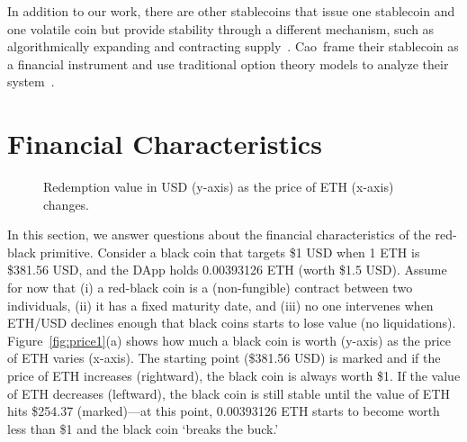 In addition to our work, there are other stablecoins that issue one stablecoin and one volatile coin but provide stability through a different mechanism, such as algorithmically expanding and contracting supply~\cite{Sam15}. Cao~\etal frame their stablecoin as a financial instrument and use traditional option theory models to analyze their system~\cite{DUOnet}.


\section{Financial Characteristics}


\begin{figure}[t]
    \centering
        \qquad
    \caption[Red-Black Coins Price Changes]{Redemption value in USD (y-axis) as the price of ETH (x-axis) changes. \label{fig:price1} \label{fig:price2}}
\end{figure}

In this section, we answer questions about the financial characteristics of the red-black primitive. Consider a black coin that targets \$1 USD when 1 ETH is \$381.56 USD, and the DApp holds 0.00393126 ETH (worth \$1.5 USD).  Assume for now that (i) a red-black coin is a (non-fungible) contract between two individuals, (ii) it has a fixed maturity date, and (iii) no one intervenes when ETH/USD declines enough that black coins starts to lose value (no liquidations). Figure~\ref{fig:price1}(a) shows how much a black coin is worth (y-axis) as the price of ETH varies (x-axis). The starting point (\$381.56 USD) is marked and if the price of ETH increases (rightward), the black coin is always worth \$1. If the value of ETH decreases (leftward), the black coin is still stable until the value of ETH hits \$254.37 (marked)---at this point, 0.00393126 ETH starts to become worth less than \$1 and the black coin `breaks the buck.'

